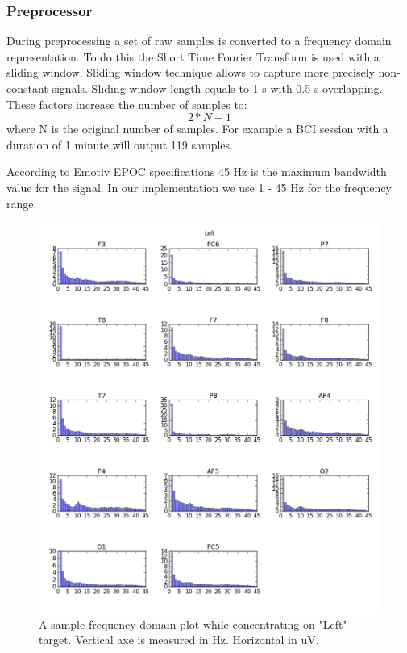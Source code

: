 \documentclass[12pt]{article}
\begin{document}
\subsubsection{Preprocessor}

During preprocessing a set of raw samples is converted to a frequency domain representation. To do this the Short Time Fourier Transform is used with a sliding window. Sliding window technique allows to capture more precisely non-constant signals. Sliding window length equals to 1 s with 0.5 s overlapping. These factors increase the number of samples to:\[2*N-1\] where N is the original number of samples. For example a BCI session with a duration of 1 minute will output 119 samples.

According to Emotiv EPOC specifications\cite{emotiv} 45 Hz is the maximum bandwidth value for the signal. In our implementation we use 1 - 45 Hz for the frequency range.

\begin{figure} [h]
\begin{center}
\includegraphics[width=1\textwidth]{left_amplitudes}
\caption{A sample frequency domain plot while concentrating on "Left" target. Vertical axe is measured in Hz. Horizontal in uV.}
\end{center}
\end{figure}
\end{document}
